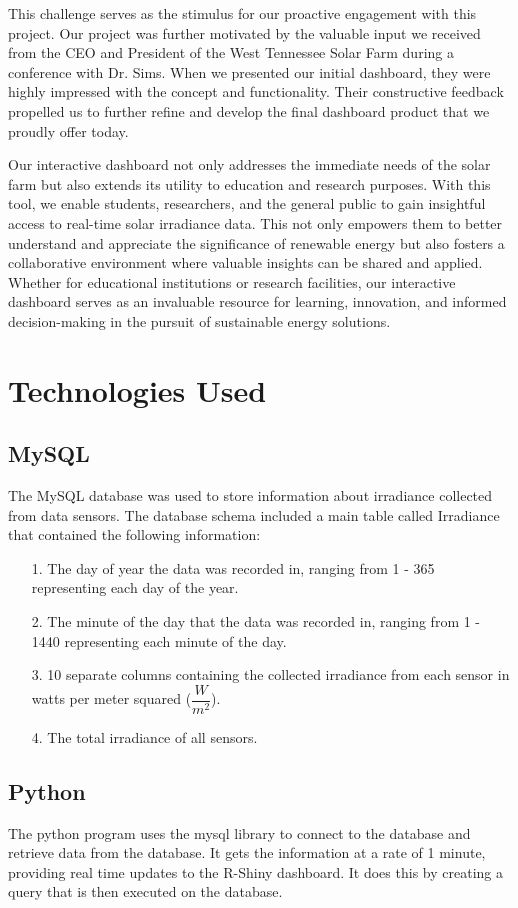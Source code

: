 \documentclass{sigchi}
\begin{document}
This challenge serves as the stimulus for our proactive engagement with this project. Our project was further motivated by the valuable input we received from the CEO and President of the West Tennessee Solar Farm during a conference with Dr. Sims. When we presented our initial dashboard, they were highly impressed with the concept and functionality. Their constructive feedback propelled us to further refine and develop the final dashboard product that we proudly offer today.

Our interactive dashboard not only addresses the immediate needs of the solar farm but also extends its utility to education and research purposes. With this tool, we enable students, researchers, and the general public to gain insightful access to real-time solar irradiance data. This not only empowers them to better understand and appreciate the significance of renewable energy but also fosters a collaborative environment where valuable insights can be shared and applied. Whether for educational institutions or research facilities, our interactive dashboard serves as an invaluable resource for learning, innovation, and informed decision-making in the pursuit of sustainable energy solutions.


\section{Technologies Used}

\subsection{MySQL}
The MySQL database was used to store information about irradiance collected from data sensors. The database schema included a main table called Irradiance that contained the following information:
\begin{itemize}
\item[1.] The day of year the data was recorded in, ranging from 1 - 365 representing each day of the year.
\item[2.] The minute of the day that the data was recorded in, ranging from 1 - 1440 representing each minute of the day.
\item[3.] 10 separate columns containing the collected irradiance from each sensor in watts per meter squared ($\dfrac{W}{m^2}$). 
\item[4.] The total irradiance of all sensors.
\end{itemize}

\subsection{Python}
The python program uses the mysql library\cite{MySQL} to connect to the database and retrieve data from the database. It gets the information at a rate of 1 minute, providing real time updates to the R-Shiny dashboard. It does this by creating a query that is then executed on the database.
\end{document}

